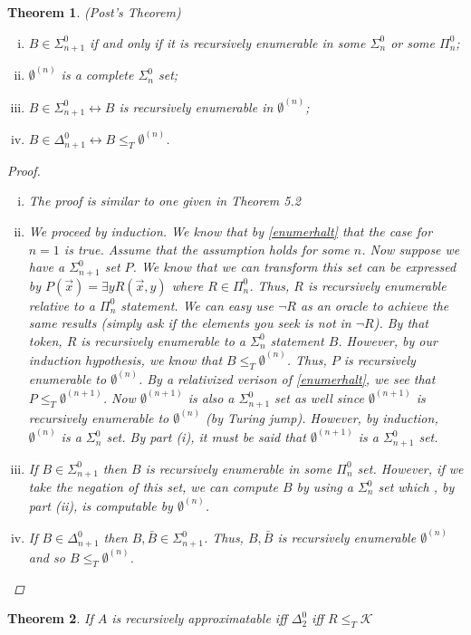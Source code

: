\documentclass[a4paper,10pt]{article}
\newtheorem{theorem}{Theorem}[section]
\newcommand*\biject{\leftrightarrow}
\newcommand*\halt{\mathcal{K}}
\begin{document}
     \begin{theorem}
      (Post's Theorem)
      \begin{enumerate}[i.]
       \item $B \in \Sigma_{n+1}^0$ if and only if it is recursively enumerable in some $\Sigma_{n}^0$ or some $\Pi_{n}^0$;
       \item $\emptyset^{(n)}$ is a complete $\Sigma_n^0$ set;
       \item $B \in \Sigma_{n+1}^0 \biject B$ is recursively enumerable in $\emptyset^{(n)}$; 
       \item $B \in \Delta_{n+1}^0 \biject B \leq_T \emptyset^{(n)}$.
      \end{enumerate}
      
      \begin{proof}
       \begin{enumerate}[i.]
        \item The proof is similar to one given in Theorem 5.2
        \item We proceed by induction. We know that by \ref{enumerhalt} that the case for $n=1$ is true. Assume that the assumption holds for some $n$. Now suppose we have a $\Sigma_{n+1}^0$ set $P$.
        We know that we can transform this set can be expressed by $P(\vec{x}) = \exists y R(\vec{x},y)$ where $R \in \Pi_{n}^0$. Thus, $R$ is recursively enumerable relative to a $\Pi_{n}^0$ statement. We can easy use $\neg R$ as an oracle to achieve the same results (simply ask if the elements you seek is not in $\neg R$).
        By that token, $R$ is recursively enumerable to a $\Sigma_{n}^0$ statement $B$. However, by our induction hypothesis, we know that $B \leq_T \emptyset^{(n)}$. Thus, $P$ is recursively enumerable to $\emptyset^{(n)}$. By a relativized verison of \ref{enumerhalt}, we see that $P \leq_T \emptyset^{(n+1)}$.
        Now $\emptyset^{(n+1)}$ is also a $\Sigma_{n+1}^0$ set as well since $\emptyset^{(n+1)}$ is recursively enumerable to $\emptyset^{(n)}$ (by Turing jump). However, by induction, $\emptyset^{(n)}$ is a $\Sigma_{n}^0$ set. By part (i), it must be said that $\emptyset^{(n+1)}$ is a $\Sigma_{n+1}^0$ set.
        \item If $B \in \Sigma_{n+1}^0$ then $B$ is recursively enumerable in some $\Pi_{n}^0$ set. However, if we take the negation of this set, we can compute $B$ by using a $\Sigma_n^0$ set which , by part (ii), is computable by $\emptyset^{(n)}$.
        \item If $B \in \Delta_{n+1}^0$ then $B, \bar{B} \in \Sigma_{n+1}^0$. Thus, $B, \bar{B}$ is recursively enumerable $\emptyset^{(n)}$ and so $B \leq_T \emptyset^{(n)}$.
       \end{enumerate}
      \end{proof}
     \end{theorem}
     
     \begin{theorem}
      If $A$ is recursively approximatable iff $\Delta_2^0$ iff $R \leq_T \halt$
     \end{theorem}

 
    
    
  



    
%     
      
\end{document}
